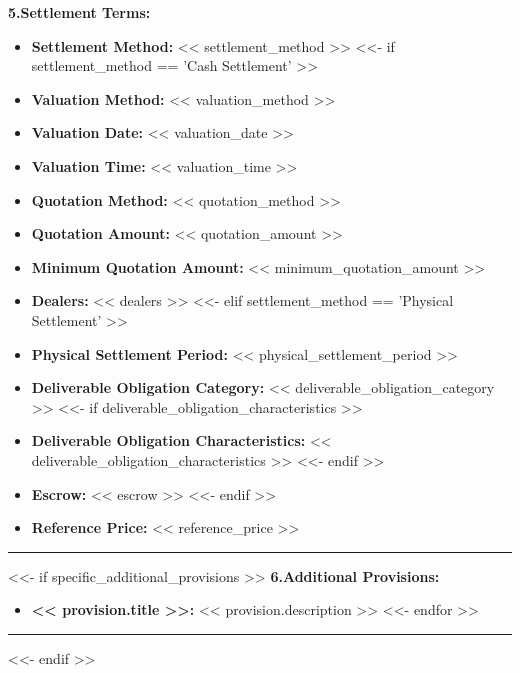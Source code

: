 \documentclass[11pt, a4paper]{article}
\begin{document}
\noindent \textbf{5.\quad Settlement Terms:}
\begin{itemize}[leftmargin=2cm, label={}, itemsep=3pt]
    \item \textbf{Settlement Method:} << settlement_method >>
<<- if settlement_method == 'Cash Settlement' >>
    \item \textbf{Valuation Method:} << valuation_method >>
    \item \textbf{Valuation Date:} << valuation_date >>
    \item \textbf{Valuation Time:} << valuation_time >>
    \item \textbf{Quotation Method:} << quotation_method >>
    \item \textbf{Quotation Amount:} << quotation_amount >>
    \item \textbf{Minimum Quotation Amount:} << minimum_quotation_amount >>
    \item \textbf{Dealers:} << dealers >>
<<- elif settlement_method == 'Physical Settlement' >>
    \item \textbf{Physical Settlement Period:} << physical_settlement_period >>
    \item \textbf{Deliverable Obligation Category:} << deliverable_obligation_category >>
<<- if deliverable_obligation_characteristics >>
    \item \textbf{Deliverable Obligation Characteristics:} << deliverable_obligation_characteristics >>
<<- endif >>
    \item \textbf{Escrow:} << escrow >>
<<- endif >>
    \item \textbf{Reference Price:} << reference_price >>
\end{itemize}

\vspace{0.5cm}
\hrule
\vspace{0.5cm}


<<- if specific_additional_provisions >>
\noindent \textbf{6.\quad Additional Provisions:}
\begin{itemize}[leftmargin=2cm, label={}, itemsep=3pt]
<<- for provision in specific_additional_provisions >>
    \item \textbf{<< provision.title >>:} << provision.description >>
<<- endfor >>
\end{itemize}
\vspace{0.3cm}
\hrule
\vspace{0.5cm}
<<- endif >>
\end{document}
